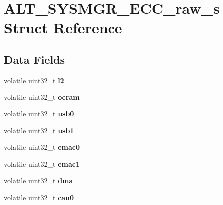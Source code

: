 \hypertarget{structALT__SYSMGR__ECC__raw__s}{}\section{A\+L\+T\+\_\+\+S\+Y\+S\+M\+G\+R\+\_\+\+E\+C\+C\+\_\+raw\+\_\+s Struct Reference}
\label{structALT__SYSMGR__ECC__raw__s}
\subsection*{Data Fields}
\begin{DoxyCompactItemize}
\item 
\mbox{\label{structALT__SYSMGR__ECC__raw__s_a1e1a0edd96178fa420356c56a9026145}} 
volatile uint32\+\_\+t {\bfseries l2}
\item 
\mbox{\label{structALT__SYSMGR__ECC__raw__s_a3ad8cc9351ca8fa3f83adb927d91a4fd}} 
volatile uint32\+\_\+t {\bfseries ocram}
\item 
\mbox{\label{structALT__SYSMGR__ECC__raw__s_a0479bd76258a2143f69ff1a3ceaa40dd}} 
volatile uint32\+\_\+t {\bfseries usb0}
\item 
\mbox{\label{structALT__SYSMGR__ECC__raw__s_abc5d9a212490b833a4173f9815341f48}} 
volatile uint32\+\_\+t {\bfseries usb1}
\item 
\mbox{\label{structALT__SYSMGR__ECC__raw__s_ac66e62a38975f42183c0c67f3ef5e016}} 
volatile uint32\+\_\+t {\bfseries emac0}
\item 
\mbox{\label{structALT__SYSMGR__ECC__raw__s_a517036956ab1f4c5b5f1a5f347676e79}} 
volatile uint32\+\_\+t {\bfseries emac1}
\item 
\mbox{\label{structALT__SYSMGR__ECC__raw__s_a83afcec2dd28aaa529d8c2758f95f9ba}} 
volatile uint32\+\_\+t {\bfseries dma}
\item 
\mbox{\label{structALT__SYSMGR__ECC__raw__s_a184c23ebcd45516992fe72091987a355}} 
volatile uint32\+\_\+t {\bfseries can0}

\end{DoxyCompactItemize}
